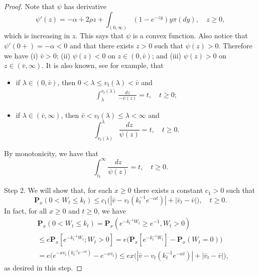 \documentclass[12pt,a4paper]{amsart}
\theoremstyle{plain}
\theoremstyle{definition}
\numberwithin{equation}{section}
\begin{document}
\begin{proof}
    Note that $\psi$ has derivative
\[
    \psi'(z)
    = -\alpha + 2\rho z + \int_{(0,\infty)}(1-e^{-zy})y\pi(dy),\quad z\geq 0,
\]
    which is increasing in $z$.
    This says that $\psi$ is a convex function.
    Also notice that $\psi'(0+)=-\alpha <0$ and that there exists $z>0$ such that $\psi(z)>0$.
    Therefore we have
(i) $\bar v > 0$; (ii) $\psi(z) < 0$ on $z\in (0,\bar v)$; and (iii) $\psi(z) > 0 $ on $z\in (\bar v, \infty)$.
    It is also known, see \cite[Proposition 3.3]{Li2011Measure-valued} for example, that
\begin{itemize}
\item
    if $\lambda \in (0,\bar v)$, then $0<\lambda \leq v_t(\lambda)<\bar v $ and
\begin{align}\label{CSBP: int}
    \int_{\lambda}^{v_t(\lambda)} \frac{dz}{-\psi(z)} = t, \quad t\geq 0;
\end{align}
\item
    if $\lambda \in (\bar v, \infty)$, then $\bar v < v_t(\lambda)\leq \lambda< \infty $ and
\[
  \int_{v_t(\lambda)}^\lambda\frac{dz}{\psi(z)} = t, \quad t\geq 0.
\]
\end{itemize}
    By monotonicity, we have that
\begin{equation}
\label{eq:svp2}
    \int_{\bar v_t}^\infty \frac{dz}{\psi(z)} = t, \quad t\geq 0.
\end{equation}

    Step 2. We will show that, for each $x \geq 0$ there exists a constant
    $c_1>0$ such that
\[
    \mathbf P_{x}(0< W_t\leq k_t)
     \leq c_1\big(|\bar v- v_t(k_t^{-1}e^{-\alpha t})|+|\bar v_t - \bar v|\big),
    \quad t\geq 0.
\]
    In fact, for all $x\geq 0$ and $t\geq 0$, we have
\begin{align}
    &\mathbf P_{x}(0<W_t \leq k_t)
    = \mathbf P_{x}( e^{-k_t^{-1}W_t}\geq e^{-1},W_t > 0)
    \\&\leq e \mathbf P_{x}[e^{-k_t^{-1} W_t};W_t > 0]
    =  e\big(\mathbf P_x[e^{-k_t^{-1} W_t}]-\mathbf P_x(W_t = 0)\big)
    \\ &= e\big(e^{-xv_t(k_t^{-1} e^{-\alpha t})}-e^{-x\bar v_t}\big)
    \leq ex \big(|\bar v-v_t(k_t^{-1} e^{-\alpha t})|+ |\bar v_t- \bar v|\big),
\end{align}
    as desired in this step.


\end{proof}
\end{document}
